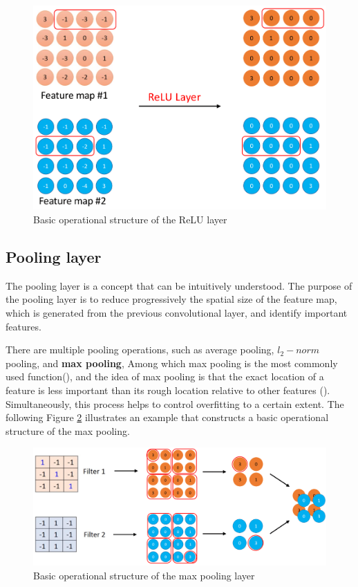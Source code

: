 \documentclass[]{krantz}
\begin{document}
\begin{figure}[ht]

{\centering \includegraphics[width=0.5\linewidth]{figures/01-03-cnns-and-their-applications-in-nlp/ReLU} 

}

\caption{Basic operational structure of the ReLU layer }\label{fig:figs-4}
\end{figure}

\hypertarget{pooling-layer}{%
\subsection{Pooling layer}\label{pooling-layer}}

The pooling layer is a concept that can be intuitively understood. The purpose of the pooling layer is to reduce progressively the spatial size of the feature map, which is generated from the previous convolutional layer, and identify important features.

There are multiple pooling operations, such as average pooling, \(l_{2}-norm\) pooling, and \textbf{max pooling}, Among which max pooling is the most commonly used function(\citet{Scherer2010EvaluationOP}), and the idea of max pooling is that the exact location of a feature is less important than its rough location relative to other features (\citet{Yamaguchi1990ANN}). Simultaneously, this process helps to control overfitting to a certain extent. The following Figure \ref{fig:figs-5} illustrates an example that constructs a basic operational structure of the max pooling.

\begin{figure}[ht]

{\centering \includegraphics[width=0.8\linewidth]{figures/01-03-cnns-and-their-applications-in-nlp/Max_Pooling_finish} 

}

\caption{Basic operational structure of the max pooling layer }\label{fig:figs-5}
\end{figure}
\end{document}
